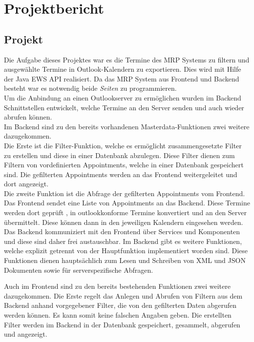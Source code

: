 \chapter{Projektbericht}
\section{Projekt}
Die Aufgabe dieses Projektes war es die Termine des MRP Systems zu filtern und ausgewählte Termine in Outlook-Kalendern zu exportieren. Dies wird mit Hilfe der Java EWS API realisiert. Da das MRP System aus Frontend und Backend besteht war es notwendig beide \textit{Seiten} zu programmieren.\\

Um die Anbindung an einen Outlookserver zu ermöglichen wurden im Backend Schnittstellen entwickelt, welche Termine an den Server senden und auch wieder abrufen können. \\

Im Backend sind zu den bereits vorhandenen Masterdata-Funktionen zwei weitere dazugekommen. \\

Die Erste ist die Filter-Funktion, welche es ermöglicht zusammengesetzte Filter zu erstellen und diese in einer Datenbank abzulegen. Diese Filter dienen zum Filtern von vordefinierten Appointments, welche in einer Datenbank gespeichert sind. Die gefilterten Appointments werden an das Frontend weitergeleitet und dort angezeigt.\\

Die zweite Funktion ist die Abfrage der gefilterten Appointments vom Frontend. Das Frontend sendet eine Liste von Appointments an das Backend. Diese Termine werden dort geprüft , in outlookkonforme Termine konvertiert und an den Server übermittelt. Diese können dann in den jeweiligen Kalendern eingesehen werden.\\ 

Das Backend kommuniziert mit den Frontend über Services und Komponenten und diese sind daher frei austauschbar. Im Backend gibt es weitere Funktionen, welche explizit getrennt von der Hauptfunktion implementiert worden sind. Diese Funktionen dienen hauptsächlich zum Lesen und Schreiben von XML und JSON Dokumenten sowie für serverspezifische Abfragen.


Auch im Frontend sind zu den bereits bestehenden Funktionen zwei weitere dazugekommen. Die Erste regelt das Anlegen und Abrufen von Filtern aus dem Backend anhand vorgegebener Filter, die von den gefilterten Daten abgerufen werden können.  Es kann somit keine falschen Angaben geben. Die erstellten Filter werden im Backend in der Datenbank gespeichert, gesammelt, abgerufen und angezeigt. \\

